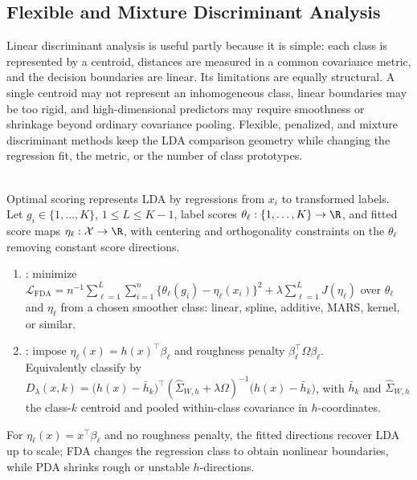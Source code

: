 \subsection{Flexible and Mixture Discriminant Analysis}

Linear discriminant analysis is useful partly because it is simple: each class is represented by a centroid, distances are measured in a common covariance metric, and the decision boundaries are linear.  Its limitations are equally structural.  A single centroid may not represent an inhomogeneous class, linear boundaries may be too rigid, and high-dimensional predictors may require smoothness or shrinkage beyond ordinary covariance pooling.  Flexible, penalized, and mixture discriminant methods keep the LDA comparison geometry while changing the regression fit, the metric, or the number of class prototypes.

\begin{method} \label{meth:sl-flexible-penalized-discriminant-analysis} \\
Optimal scoring represents LDA by regressions from $x_i$ to transformed labels.\\
Let $g_i\in\{1,\ldots,K\}$, $1\leq L\leq K-1$, label scores $\theta_\ell:\{1,\ldots,K\}\to\R$, and fitted score maps $\eta_\ell:\mathcal{X}\to\R$, with centering and orthogonality constraints on the $\theta_\ell$ removing constant score directions.
\begin{enumerate}[label=(\roman*)]
\setlength{\itemsep}{0pt}
\item {}: minimize $\mathcal{L}_{\mathrm{FDA}}=n^{-1}\sum\limits_{\ell=1}^{L}\sum\limits_{i=1}^{n}\{\theta_\ell(g_i)-\eta_\ell(x_i)\}^2+\lambda\sum\limits_{\ell=1}^{L}J(\eta_\ell)$ over $\theta_\ell$ and $\eta_\ell$ from a chosen smoother class: linear, spline, additive, MARS, kernel, or similar.
\item {}: impose $\eta_\ell(x)=h(x)^\top\beta_\ell$ and roughness penalty $\beta_\ell^\top\Omega\beta_\ell$.\\
Equivalently classify by $D_\lambda(x,k)=\bigl(h(x)-\bar{h}_k\bigr)^\top(\widehat{\Sigma}_{W,h}+\lambda\Omega)^{-1}\bigl(h(x)-\bar{h}_k\bigr)$, with $\bar{h}_k$ and $\widehat{\Sigma}_{W,h}$ the class-$k$ centroid and pooled within-class covariance in $h$-coordinates.
\end{enumerate}
For $\eta_\ell(x)=x^\top\beta_\ell$ and no roughness penalty, the fitted directions recover LDA up to scale; FDA changes the regression class to obtain nonlinear boundaries, while PDA shrinks rough or unstable $h$-directions.
\end{method}

